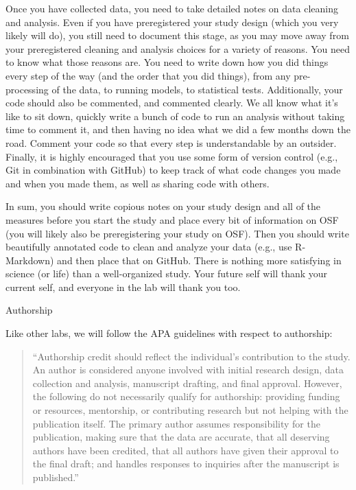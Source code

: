 \documentclass[]{book}
\begin{document}
Once you have collected data, you need to take detailed notes on data cleaning and analysis. Even if you have preregistered your study design (which you very likely will do), you still need to document this stage, as you may move away from your preregistered cleaning and analysis choices for a variety of reasons. You need to know what those reasons are. You need to write down how you did things every step of the way (and the order that you did things), from any pre-processing of the data, to running models, to statistical tests. Additionally, your code should also be commented, and commented clearly. We all know what it's like to sit down, quickly write a bunch of code to run an analysis without taking time to comment it, and then having no idea what we did a few months down the road. Comment your code so that every step is understandable by an outsider. Finally, it is highly encouraged that you use some form of version control (e.g., Git in combination with GitHub) to keep track of what code changes you made and when you made them, as well as sharing code with others.

In sum, you should write copious notes on your study design and all of the measures before you start the study and place every bit of information on OSF (you will likely also be preregistering your study on OSF). Then you should write beautifully annotated code to clean and analyze your data (e.g., use R-Markdown) and then place that on GitHub. There is nothing more satisfying in science (or life) than a well-organized study. Your future self will thank your current self, and everyone in the lab will thank you too.

Authorship

Like other labs, we will follow the APA guidelines with respect to authorship:

\begin{quote}
``Authorship credit should reflect the individual's contribution to the study. An author is considered anyone involved with initial research design, data collection and analysis, manuscript drafting, and final approval. However, the following do not necessarily qualify for authorship: providing funding or resources, mentorship, or contributing research but not helping with the publication itself. The primary author assumes responsibility for the publication, making sure that the data are accurate, that all deserving authors have been credited, that all authors have given their approval to the final draft; and handles responses to inquiries after the manuscript is published.''
\end{quote}
\end{document}

